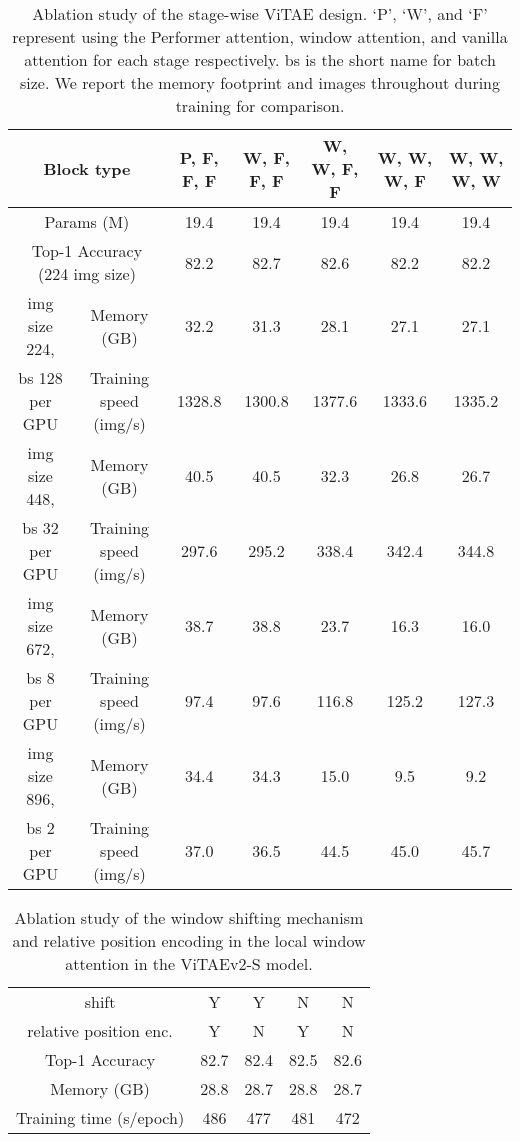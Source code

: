 \documentclass[twocolumn]{svjour3}          \smartqed  \usepackage{natbib}
\begin{document}
\begin{table*}[htbp]
  \centering
  \caption{Ablation study of the stage-wise ViTAE design. `P', `W', and `F' represent using the Performer attention, window attention, and vanilla attention for each stage respectively. bs is the short name for batch size. We report the memory footprint and images throughout during training for comparison.}
    \begin{tabular}{c|c|c|c|c|c|c}
    \hline
    \multicolumn{2}{c|}{{Block type}} & P, F, F, F & W, F, F, F & W, W, F, F & W, W, W, F & W, W, W, W \\
    \hline
    \multicolumn{2}{c|}{{Params (M)}} & 19.4  & 19.4  & 19.4  & 19.4  & 19.4 \\
    \hline
    \multicolumn{2}{c|}{{Top-1 Accuracy (224 img size)}} & 82.2  & 82.7  & 82.6  & 82.2  & 82.2 \\
    \hline
    {img size 224, } & Memory (GB) & 32.2  & 31.3  & 28.1  & 27.1  & 27.1 \\
    {bs 128 per GPU} & Training speed (img/s) & 1328.8  & 1300.8  & 1377.6  & 1333.6  & 1335.2 \\
    \hline
    {img size 448, } & Memory (GB) &  40.5 & 40.5  & 32.3  & 26.8  & 26.7 \\
    {bs 32 per GPU} & Training speed (img/s) & 297.6 & 295.2 & 338.4 & 342.4   & 344.8 \\
    \hline
    {img size 672, } & Memory (GB) & 38.7  & 38.8  & 23.7  & 16.3  & 16.0 \\
    {bs 8 per GPU} & Training speed (img/s) & 97.4    & 97.6    & 116.8   & 125.2   & 127.3 \\
    \hline
    {img size 896, } & Memory (GB) & 34.4  & 34.3  & 15.0  & 9.5   & 9.2 \\
    {bs 2 per GPU} & Training speed (img/s) & 37.0    & 36.5    & 44.5    & 45.0    & 45.7 \\
    \hline
    \end{tabular}\label{tab:StageWiseArchDesign}\end{table*}

\begin{table}[htbp]
  \centering
  \caption{Ablation study of the window shifting mechanism and relative position encoding in the local window attention in the ViTAEv2-S model.
  }
    \begin{tabular}{c|cccc}
    \hline
    shift & Y     & Y     & N     & N \\
    relative position enc. & Y     & N     & Y     & N \\
    \hline
    Top-1 Accuracy & 82.7  & 82.4  & 82.5  & 82.6 \\
    Memory (GB) & 28.8  & 28.7  & 28.8  & 28.7 \\
    Training time (s/epoch) & 486  & 477  & 481  & 472 \\
    \hline
    \end{tabular}\label{tab:ablation_RPE_Shift}\end{table}
\end{document}
